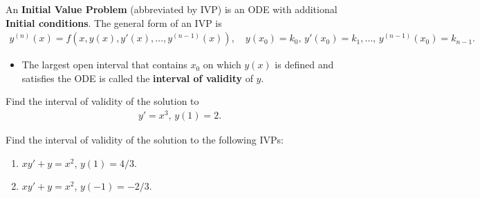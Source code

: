 \documentclass[12pt,a4paper]{article}
\newcounter{example}[section]
\begin{document}
\newpage

An \textbf{Initial Value Problem} (abbreviated by IVP) is an ODE with additional \textbf{Initial conditions}. The general form of an IVP is
	\begin{align*}
	y^{(n)}(x) = f(x, y(x) , y'(x) , \ldots , y^{(n-1)}(x)), \quad y(x_0) = k_0 , \, y' (x_0) = k_1 , \ldots , \, y^{(n-1)}(x_0) = k_{n-1} .
	\end{align*}
	
\begin{itemize}
\item The largest open interval that contains $x_0$ on which $y(x)$ is defined and satisfies the ODE is called the \textbf{interval of validity} of $y$.
\end{itemize}

\vspace*{16pt}

\begin{example}
Find the interval of validity of the solution to
	\begin{align*}
	y' = x^3 , \, y(1) = 2 .
	\end{align*}
\end{example}

\newpage

\begin{example}
Find the interval of validity of the solution to the following IVPs:
	\begin{enumerate}
	\item $xy' + y = x^2$, $y (1) = 4/3$.
	\item $xy' + y = x^2$, $y (-1) = -2/3$.
	\end{enumerate}
\end{example}
\end{document}
